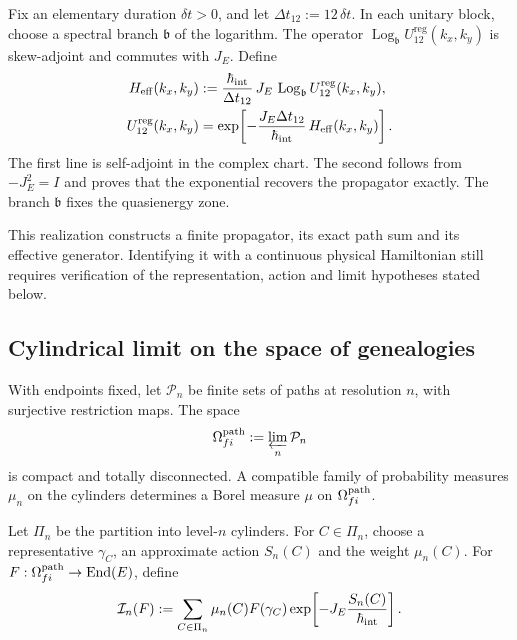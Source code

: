 Fix an elementary duration \(\delta t>0\), and let
\(\Delta t_{12}:=12\,\delta t\). In each unitary block, choose a spectral
branch \(\mathfrak b\) of the logarithm. The operator
\(\operatorname{Log}_{\mathfrak b}U_{12}^{\mathrm{reg}}(k_x,k_y)\) is
skew-adjoint and commutes with \(J_E\). Define
\begin{equation}
 \begin{aligned}
 H_{\rm eff}(k_x,k_y)
 &:=
 \frac{\hbar_{\rm int}}{\Delta t_{12}}\,
 J_E\,
 \operatorname{Log}_{\mathfrak b}
 U_{12}^{\mathrm{reg}}(k_x,k_y),\\
 U_{12}^{\mathrm{reg}}(k_x,k_y)
 &=
 \exp\!\left[
  -\frac{J_E\Delta t_{12}}{\hbar_{\rm int}}\,
  H_{\rm eff}(k_x,k_y)
 \right].
 \end{aligned}
 \label{x_reciprocidad:eq:hamiltoniano-efectivo-registro-27-rev3}
\end{equation}
The first line is self-adjoint in the complex chart. The second follows from
\(-J_E^2=I\) and proves that the exponential recovers the
propagator exactly. The branch \(\mathfrak b\) fixes the quasienergy zone.

This realization constructs a finite propagator, its exact path sum and
its effective generator. Identifying it with a continuous physical Hamiltonian
still requires verification of the representation, action and limit hypotheses
stated below.

\subsection{Cylindrical limit on the space of genealogies}

With endpoints fixed, let \(\mathcal P_n\) be finite sets of paths at
resolution \(n\), with surjective restriction maps. The space
\[
 \Omega^{\rm path}_{fi}:=\varprojlim_n\mathcal P_n
\]
is compact and totally disconnected. A compatible family of probability
measures \(\mu_n\) on the cylinders determines a Borel measure
\(\mu\) on \(\Omega^{\rm path}_{fi}\).

Let \(\Pi_n\) be the partition into level-\(n\) cylinders. For
\(C\in\Pi_n\), choose a representative \(\gamma_C\), an approximate action
\(S_n(C)\) and the weight \(\mu_n(C)\). For
\(F:\Omega^{\rm path}_{fi}\to\operatorname{End}(E)\), define
\begin{equation}
 \mathcal I_n(F)
 :=\sum_{C\in\Pi_n}\mu_n(C)F(\gamma_C)
 \exp\!\left[-J_E\frac{S_n(C)}{\hbar_{\rm int}}\right].
 \label{x_reciprocidad:eq:integral-cilindrica-aproximante-rev2}
\end{equation}

